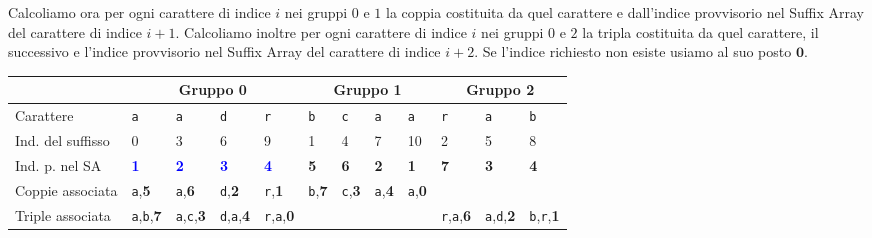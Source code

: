 Calcoliamo ora per ogni carattere di indice \(i\) nei gruppi \(0\) e \(1\) la 
coppia costituita da quel carattere e dall'indice provvisorio nel Suffix Array
del carattere di indice \(i+1\). Calcoliamo inoltre per ogni carattere di indice 
\(i\) nei gruppi \(0\) e \(2\) la tripla costituita da quel carattere, il 
successivo e l'indice provvisorio nel Suffix Array del carattere di indice 
\(i+2\). Se l'indice richiesto non esiste usiamo al suo posto \(\textbf{0}\).
\begin{table}[H]
  \begin{tabularx}{\linewidth}{l*{11}{X}}
                        & \multicolumn{4}{c}{Gruppo 0 \cellcolor{green} } 
                        & \multicolumn{4}{c}{Gruppo 1 \cellcolor{red} } 
                        & \multicolumn{3}{c}{Gruppo 2 \cellcolor{yellow} }\\
    \hline
    Carattere           & \texttt{a} & \texttt{a} & \texttt{d} & \texttt{r}
                        & \texttt{b} & \texttt{c} & \texttt{a} & \texttt{a}
                        & \texttt{r} & \texttt{a} & \texttt{b} \\
    Ind. del suffisso   & 0 & 3 & 6 & 9
                        & 1 & 4 & 7 & 10
                        & 2 & 5 & 8 \\
    Ind. p. nel SA      & \textcolor{blue}{\textbf{1}} 
                        & \textcolor{blue}{\textbf{2}} 
                        & \textcolor{blue}{\textbf{3}}
                        & \textcolor{blue}{\textbf{4}}
                        & \textbf{5} & \textbf{6} & \textbf{2} & \textbf{1}
                        & \textbf{7} & \textbf{3} & \textbf{4} \\

    Coppie associata    & \texttt{a},\textbf{5} & \texttt{a},\textbf{6}
                        & \texttt{d},\textbf{2} & \texttt{r},\textbf{1}
                        & \texttt{b},\textbf{7} & \texttt{c},\textbf{3}
                        & \texttt{a},\textbf{4} & \texttt{a},\textbf{0}
                        & \multicolumn{3}{c}{\cellcolor{gray!25}} \\
    Triple associata    & \texttt{a},\texttt{b},\textbf{7}
                        & \texttt{a},\texttt{c},\textbf{3}
                        & \texttt{d},\texttt{a},\textbf{4} 
                        & \texttt{r},\texttt{a},\textbf{0}
                        & \multicolumn{4}{c}{\cellcolor{gray!25}}
                        & \texttt{r},\texttt{a},\textbf{6}
                        & \texttt{a},\texttt{d},\textbf{2}
                        & \texttt{b},\texttt{r},\textbf{1} \\
  \end{tabularx}
\end{table}

